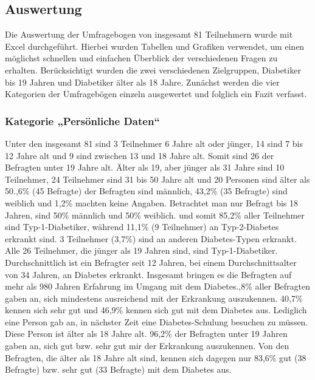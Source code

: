 \documentclass[a4paper,11pt]{article}%
\renewcommand{\\}{\vspace*{0.5\baselineskip} \newline}
\begin{document}
\subsection{Auswertung}
	Die Auswertung der Umfragebogen von insgesamt 81 Teilnehmern wurde mit Excel durchgeführt. Hierbei wurden Tabellen und Grafiken verwendet, um einen möglichst schnellen und einfachen Überblick der verschiedenen Fragen zu erhalten. Berücksichtigt wurden die zwei verschiedenen Zielgruppen, Diabetiker bis 19 Jahren und Diabetiker älter als 18 Jahre.
	Zunächst werden die vier Kategorien der Umfragebögen einzeln ausgewertet und folglich ein Fazit verfasst.
\subsubsection{Kategorie „Persönliche Daten“}
	Unter den insgesamt 81 sind 3 Teilnehmer 6 Jahre alt oder jünger, 14 sind 7 bis 12 Jahre alt und 9 sind zwischen 13 und 18 Jahre alt. Somit sind 26 der Befragten unter 19 Jahre alt. Älter als 19, aber jünger als 31 Jahre sind 10 Teilnehmer, 24 Teilnehmer sind 31 bis 50 Jahre alt und 20 Personen sind älter als 50.,6\% (45 Befragte) der Befragten sind männlich, 43,2\% (35 Befragte) sind weiblich und 1,2\% machten keine Angaben. Betrachtet man nur Befragt bis 18 Jahren, sind 50\% männlich und 50\% weiblich. und somit 85,2\% aller Teilnehmer sind Typ-1-Diabetiker, während 11,1\% (9 Teilnehmer) an Typ-2-Diabetes erkrankt sind. 3 Teilnehmer (3,7\%) sind an anderen Diabetes-Typen erkrankt. Alle 26 Teilnehmer, die jünger als 19 Jahren sind, sind Typ-1-Diabetiker.\newline
	Durchschnittlich ist ein Befragter seit 12 Jahren, bei einem Durchschnittsalter von 34 Jahren, an Diabetes erkrankt. Insgesamt bringen es die Befragten auf mehr als 980 Jahren Erfahrung im Umgang mit dem Diabetes.,8\% aller Befragten gaben an, sich mindestens ausreichend mit der Erkrankung auszukennen. 40,7\% kennen sich sehr gut und 46,9\% kennen sich gut mit dem Diabetes aus. Lediglich eine Person gab an, in nächster Zeit eine Diabetes-Schulung besuchen zu müssen.\newline
	Diese Person ist älter als 18 Jahre alt. 96,2\% der Befragten unter 19 Jahren gaben an, sich gut bzw. sehr gut mir der Erkrankung auszukennen. Von den Befragten, die älter als 18 Jahre alt sind, kennen sich dagegen nur 83,6\% gut (38 Befragte) bzw. sehr gut (33 Befragte) mit dem Diabetes aus.\newline
\end{document}
